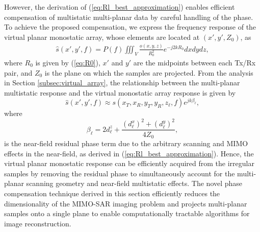 \documentclass{ieeeaccess}
\begin{document}
However, the derivation of (\ref{eq:Rl_best_approximation}) enables efficient compensation of multistatic multi-planar data by careful handling of the phase.
To achieve the proposed compensation, we express the frequency response of the virtual planar monostatic array, whose elements are located at $(x',y',Z_0)$, as
\begin{multline}
    \label{eq:virtual_planar}
    \hat{s}(x',y',f) = P(f) \iiint_V \frac{o(x,y,z)}{R_0^2} e^{-j2kR_0} dx dy dz,
\end{multline}
where $R_0$ is given by (\ref{eq:R0}), $x'$ and $y'$ are the midpoints between each Tx/Rx pair, and $Z_0$ is the plane on which the samples are projected. 
From the analysis in Section \ref{subsec:virtual_array}, the relationship between the multi-planar multistatic response and the virtual monostatic array response is given by
\begin{equation}
    \label{eq:multiplanar_compensation}
    \hat{s}(x',y',f) \approx s(x_T,x_R,y_T,y_R,z_\ell,f) e^{j k\beta_\ell},
\end{equation}
where
\begin{equation}
    \beta_\ell = 2 d_\ell^z + \frac{(d_\ell^x)^2 + (d_\ell^y)^2}{4 Z_0},
\end{equation}
is the near-field residual phase term due to the arbitrary scanning and MIMO effects in the near-field, as derived in (\ref{eq:Rl_best_approximation}). 
Hence, the virtual planar monostatic response can be efficiently acquired from the irregular samples by removing the residual phase to simultaneously account for the multi-planar scanning geometry and near-field multistatic effects. 
The novel phase compensation technique derived in this section efficiently reduces the dimensionality of the MIMO-SAR imaging problem and projects multi-planar samples onto a single plane to enable computationally tractable algorithms for image reconstruction.
\end{document}
